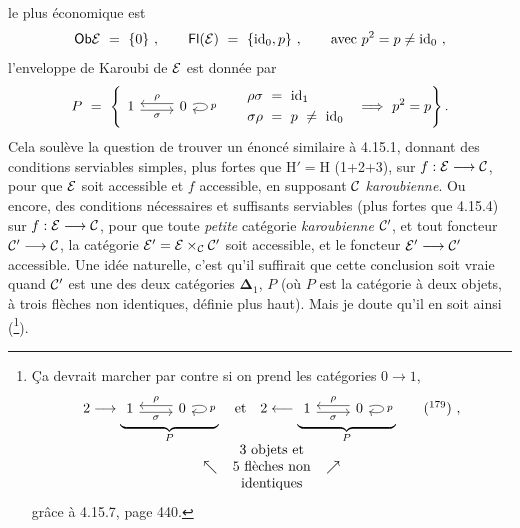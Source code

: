 le plus économique est
\[
\Ob \cE \ = \ \{0\} \ , \qquad \Fl(\cE) \ = \ \{\id_0, p\} \ , \qquad \text{avec } p^2 = p \neq \id_0 \ ,
\]
l'enveloppe de Karoubi de $\mathcal{E}$ est donnée par
\[
P \ = \ \left\{
\begin{tikzcd}
1 \arrow[r, shift right, "\sigma"'] & 0 \arrow[l, shift right, "\rho"'] \arrow[loop right, "p"]
\end{tikzcd}
\qquad
\begin{aligned}
\rho\sigma \ &= \ \id_1 \\
\sigma\rho \ &= \ p \ \neq \ \id_0
\end{aligned}
\quad \Longrightarrow \ p^2 = p
\right\} .
\]
Cela soulève la question de trouver un énoncé similaire à 4.15.1, donnant des conditions serviables simples, plus fortes que $\mathrm{H}' = \mathrm{H}$ (1+2+3), sur $f : \mathcal{E} \longrightarrow \mathcal{C}$, pour que $\mathcal{E}$ soit accessible et $f$ accessible, en supposant $\mathcal{C}$ \textit{karoubienne}. Ou encore, des conditions nécessaires et
suffisants serviables (plus fortes que 4.15.4) sur $f : \mathcal{E} \longrightarrow \mathcal{C}$, pour que toute \textit{petite} catégorie %
\textit{karoubienne} $\mathcal{C}'$, et tout foncteur $\mathcal{C}' \longrightarrow \mathcal{C}$, la catégorie $\mathcal{E}' = \mathcal{E} \times_{\mathcal{C}} \mathcal{C}'$ soit accessible, et le foncteur $\mathcal{E}' \longrightarrow \mathcal{C}'$ accessible. Une idée naturelle, c'est qu'il suffirait que cette conclusion soit vraie quand $\mathcal{C}'$ est une des deux catégories $\mathbf{\Delta}_1$, $P$ (où $P$ est la catégorie à deux objets, à trois flèches non identiques, définie plus haut). Mais je doute qu'il en soit ainsi (\footnote[178]{Ça devrait marcher par contre si on prend les catégories $0 \longrightarrow 1$,
\[
\begin{array}{c}
2 \longrightarrow \underbrace{\begin{tikzcd}[ampersand replacement=\&]
1 \arrow[r, shift right, "\sigma"'] \& 0 \arrow[l, shift right, "\rho"'] \arrow[loop right, "p"]
\end{tikzcd}}_{P}
\quad \text{et} \quad
2 \longleftarrow \underbrace{\begin{tikzcd}[ampersand replacement=\&]
1 \arrow[r, shift right, "\sigma"'] \& 0 \arrow[l, shift right, "\rho"'] \arrow[loop right, "p"]
\end{tikzcd}}_{P}
\qquad (\text{\footnotemark[179]}) \ , \\
\nwarrow \ \begin{array}{c} \text{3 objets et} \\ \text{5 flèches non} \\ \text{identiques} \end{array} \ \nearrow
\end{array}
\]
grâce à 4.15.7, page 440.}).

